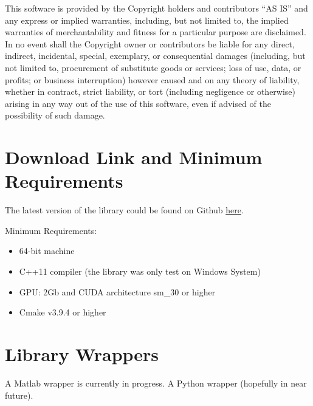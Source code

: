 \documentclass[12pt,letterpaper]{article}
\begin{document}
    This software is provided by the Copyright holders and contributors
    ``AS IS'' and any express or implied warranties, including, but not
    limited to, the implied warranties of merchantability and fitness for
    a particular purpose are disclaimed. In no event shall the Copyright
    owner or contributors be liable for any direct, indirect, incidental,
    special, exemplary, or consequential damages (including, but not
    limited to, procurement of substitute goods or services; loss of use,
    data, or profits; or business interruption) however caused and on any
    theory of liability, whether in contract, strict liability, or tort
    (including negligence or otherwise) arising in any way out of the use
    of this software, even if advised of the possibility of such damage.
\section{Download Link and Minimum Requirements}
The latest version of the library could be found on Github \href{https://github.com/sydbarrett/AlphaPathMoves}{here}.

\noindent Minimum Requirements:
\begin{itemize}
\item 64-bit machine
\item C++11 compiler (the library was only test on Windows System)
\item GPU: 2Gb and CUDA architecture sm\_30 or higher
\item Cmake v3.9.4 or higher
\end{itemize}

\section{Library Wrappers}
A Matlab wrapper is currently in progress.
A Python wrapper (hopefully in near future).
\end{document}
